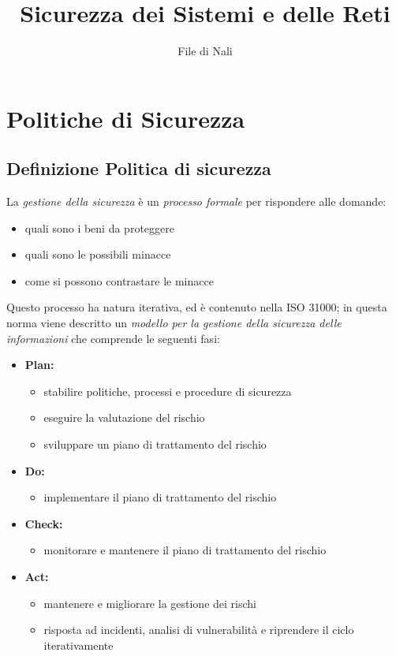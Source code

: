 \documentclass{report}
\title{\huge\textbf{{Sicurezza dei Sistemi e delle Reti}}}
\date{File di Nali}
\begin{document}
\maketitle

\tableofcontents
\newpage

\chapter{Politiche di Sicurezza}
\section{Definizione Politica di sicurezza}

La \textit{gestione della sicurezza} è un \textit{processo formale} 
per rispondere alle domande:
\begin{itemize}
    \item quali sono i beni da proteggere
    \item quali sono le possibili minacce
    \item come si possono contrastare le minacce 
\end{itemize}

\noindent Questo processo ha natura iterativa, ed è contenuto nella ISO 31000; in 
questa norma viene descritto un \textit{modello per la gestione della sicurezza 
delle informazioni} che comprende le seguenti fasi:
\begin{itemize}
    \item \textbf{Plan:}
    \begin{itemize}
        \item stabilire politiche, processi e procedure di sicurezza
        \item eseguire la valutazione del rischio 
        \item sviluppare un piano di trattamento del rischio 
    \end{itemize}
    \item \textbf{Do:}
    \begin{itemize}
        \item implementare il piano di trattamento del rischio
    \end{itemize}
    \item \textbf{Check:}
    \begin{itemize}
        \item monitorare e mantenere il piano di trattamento del rischio
    \end{itemize}
    \item \textbf{Act:}
    \begin{itemize}
        \item mantenere e migliorare la gestione dei rischi 
        \item risposta ad incidenti, analisi di vulnerabilità e riprendere il ciclo iterativamente
    \end{itemize}
\end{itemize}
\end{document}
